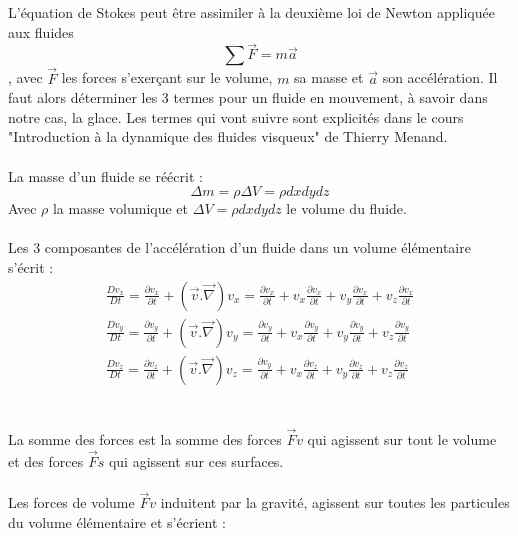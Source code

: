 \documentclass{article}
\begin{document}
L'équation de Stokes peut être assimiler à la deuxième loi de Newton appliquée aux fluides
\begin{equation}
\sum\vec{F}=m\vec{a}
\end{equation}
 , avec  $\vec{F}$ les forces s'exerçant sur le volume, $m$ sa masse et  $\vec{a}$  son accélération.
Il faut alors déterminer les 3 termes pour un fluide en mouvement, à savoir dans notre cas, la glace. \newline
Les termes qui vont suivre sont explicités dans le cours "Introduction à la dynamique des fluides visqueux" de Thierry Menand.\cite{menand2020introduction}
\\\\
La masse d'un fluide se réécrit :
\begin{equation}
\Delta m = \rho \Delta V = \rho dxdydz
\end{equation}
Avec $\rho$ la masse volumique et $\Delta V = \rho dxdydz $ le volume du fluide.
\\\\
Les 3 composantes de l'accélération d'un fluide dans un volume élémentaire s'écrit : 
\begin{equation}
\begin{array}{l}
\frac{D v_{x}}{Dt} = \frac{\partial v_{x}}{\partial t} + (\vec{v}.\vec{\nabla})v_{x} = \frac{\partial v_{x}}{\partial t} + v_{x} \frac{\partial v_{x}}{\partial t} + v_{y} \frac{\partial v_{x}}{\partial t} + v_{z} \frac{\partial v_{x}}{\partial t}  \\
\frac{D v_{y}}{Dt} = \frac{\partial v_{y}}{\partial t} + (\vec{v}.\vec{\nabla})v_{y} = \frac{\partial v_{y}}{\partial t} + v_{x} \frac{\partial v_{y}}{\partial t} + v_{y} \frac{\partial v_{y}}{\partial t} + v_{z} \frac{\partial v_{y}}{\partial t} \\
\frac{D v_{z}}{Dt} = \frac{\partial v_{z}}{\partial t} + (\vec{v}.\vec{\nabla})v_{z} = \frac{\partial v_{y}}{\partial t} + v_{x} \frac{\partial v_{z}}{\partial t} + v_{y} \frac{\partial v_{z}}{\partial t} + v_{z} \frac{\partial v_{z}}{\partial t}
\end{array}
\label{eq1}
\end{equation}
\\\\
La somme des forces est la somme des forces $\vec{F}v$ qui agissent sur tout le volume et des forces $\vec{F}s$ qui agissent sur ces surfaces.
\\\\
Les forces de volume  $\vec{F}v$ induitent par la gravité, agissent sur toutes les particules du volume élémentaire et s'écrient :
\end{document}
